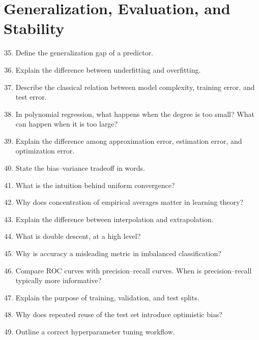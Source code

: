 \section*{Generalization, Evaluation, and Stability}

\begin{enumerate}
\setcounter{enumi}{34}
    \item Define the generalization gap of a predictor.

    \item Explain the difference between underfitting and overfitting.

    \item Describe the classical relation between model complexity, training error, and test error.

    \item In polynomial regression, what happens when the degree is too small? What can happen when it is too large?

    \item Explain the difference among approximation error, estimation error, and optimization error.

    \item State the bias--variance tradeoff in words.

    \item What is the intuition behind uniform convergence?

    \item Why does concentration of empirical averages matter in learning theory?

    \item Explain the difference between interpolation and extrapolation.

    \item What is double descent, at a high level?

    \item Why is accuracy a misleading metric in imbalanced classification?

    \item Compare ROC curves with precision--recall curves. When is precision--recall typically more informative?

    \item Explain the purpose of training, validation, and test splits.

    \item Why does repeated reuse of the test set introduce optimistic bias?

    \item Outline a correct hyperparameter tuning workflow.


\end{enumerate}
